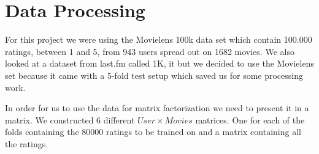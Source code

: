 \section{Data Processing}\label{sec:data_preprocessing}
For this project we were using the Movielens 100k data set which contain 100.000 ratings, between 1 and 5, from 943 users spread out on 1682 movies\cite{movielens100k}. 
We also looked at a dataset from last.fm called 1K\cite{lastfmdataset}, it but we decided to use the Movielens set because it came with a 5-fold test setup which saved us for some processing work.

In order for us to use the data for matrix factorization we need to present it in a matrix. We constructed 6 different $User \times Movies$ matrices. One for each of the folds containing the 80000 ratings to be trained on and a matrix containing all the ratings.



